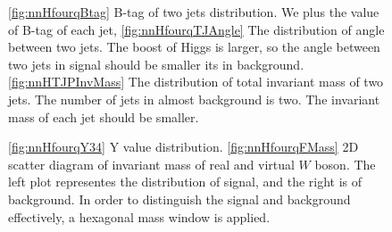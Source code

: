 \documentclass[11pt,a4paper]{cepcnote}
\begin{document}
\begin{figure}[H]
	\centering
	\caption[]{
		\ref{fig:nnHfourqBtag} B-tag of two jets distribution. We plus the value of B-tag of each jet, 
		\ref{fig:nnHfourqTJAngle} The distribution of angle between two jets. The boost of Higgs is larger, so the angle 
		between two jets in signal should be smaller its in background. 
		\ref{fig:nnHTJPInvMass} The distribution of total invariant mass of two jets. The number of jets in almost background is two. 
		The invariant mass of each jet should be smaller.}
	\label{fig:nnHfourqTwoJet}
\end{figure}
\begin{figure}[H]
	\centering
	\caption[]{
		\ref{fig:nnHfourqY34} Y value distribution. 
		\ref{fig:nnHfourqFMass} 2D scatter diagram of invariant mass of real and virtual $W$ boson. The left plot representes the distribution 
		of signal, and the right is of background. In order to distinguish the signal and background effectively, a hexagonal mass window is 
		applied.}
	\label{fig:nnHfourqFourJet}
\end{figure}
\end{document}
